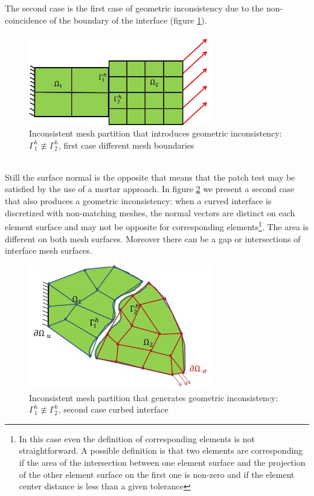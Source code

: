  The second case is the first case of geometric inconsistency due to the non-coincidence of the boundary of the interface (figure \ref{fig.5}).
 \begin{figure}[ht]
 \centering
 \includegraphics[width=8cm]{images/Ch1/Mesh_inconsist_2}
 \caption{Inconsistent mesh partition that introduces geometric inconsistency: $\Gamma_1^{h} \not\equiv  \Gamma_2^{h} $, first case different mesh boundaries} 
 \label{fig.5}
 \end{figure}
  \\
 Still the surface normal is the opposite that means that the patch test may be satisfied by the use of a mortar approach. In figure \ref{fig.6} we present a second case that also produces a geometric inconsistency: when a curved interface is discretized with non-matching meshes, the normal vectors are distinct on each element surface and may not be opposite for corresponding elements\footnote{In this case even the definition of corresponding elements is not straightforward. A possible definition  is that two elements are corresponding if the area of the intersection between one element surface and the projection of the other element surface on the first one is non-zero and if the element center distance is less than a given tolerance }. The area is different on both mesh surfaces. Moreover there can be a gap or intersections of interface mesh surfaces. 
 \begin{figure}[ht]
 \centering
 \includegraphics[width=8cm]{images/Ch1/Mesh_inconsist_3}
 \caption{Inconsistent mesh partition that generates geometric inconsistency: $\Gamma_1^{h} \not\equiv  \Gamma_2^{h} $, second case curbed interface} 
 \label{fig.6}
 \end{figure}

